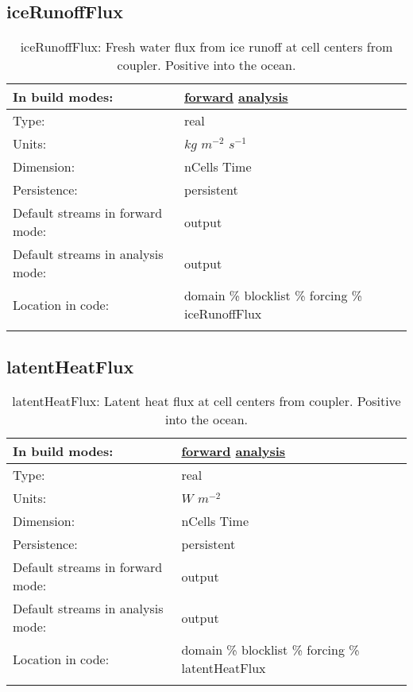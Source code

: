 \subsection[iceRunoffFlux]{iceRunoffFlux}
\label{subsec:var_sec_forcing_iceRunoffFlux}
\begin{center}
\begin{longtable}{| p{2.0in} | p{4.0in} |}
        \hline 
        In build modes: & \hyperref[subsec:forward_var_tab_forcing]{forward} \hyperref[subsec:analysis_var_tab_forcing]{analysis} \\
        \hline 
        Type: & real \\
        \hline 
        Units: & $kg$ $m^{-2}$ $s^{-1}$ \\
        \hline 
        Dimension: & nCells Time \\
        \hline 
        Persistence: & persistent \\
        \hline 
		 Default streams in forward mode: &  output \\
        \hline 
		 Default streams in analysis mode: &  output \\
        \hline 
		 Location in code: & domain \% blocklist \% forcing \% iceRunoffFlux \\
		 \hline 
    \caption{iceRunoffFlux: Fresh water flux from ice runoff at cell centers from coupler. Positive into the ocean.}
\end{longtable}
\end{center}
\subsection[latentHeatFlux]{latentHeatFlux}
\label{subsec:var_sec_forcing_latentHeatFlux}
\begin{center}
\begin{longtable}{| p{2.0in} | p{4.0in} |}
        \hline 
        In build modes: & \hyperref[subsec:forward_var_tab_forcing]{forward} \hyperref[subsec:analysis_var_tab_forcing]{analysis} \\
        \hline 
        Type: & real \\
        \hline 
        Units: & $W$ $m^{-2}$ \\
        \hline 
        Dimension: & nCells Time \\
        \hline 
        Persistence: & persistent \\
        \hline 
		 Default streams in forward mode: &  output \\
        \hline 
		 Default streams in analysis mode: &  output \\
        \hline 
		 Location in code: & domain \% blocklist \% forcing \% latentHeatFlux \\
		 \hline 
    \caption{latentHeatFlux: Latent heat flux at cell centers from coupler. Positive into the ocean.}
\end{longtable}
\end{center}
